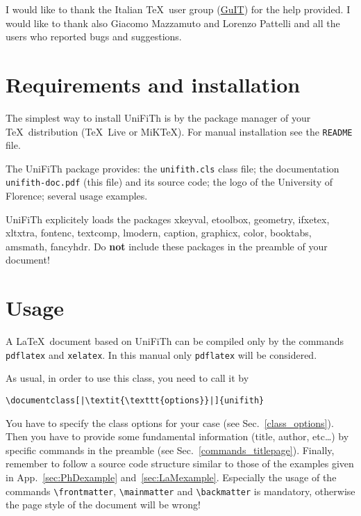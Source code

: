 \documentclass[a5paper,11pt]{article}
\newcommand{\bs}{\textbackslash}
\begin{document}
I would like to thank the Italian \TeX\ user group (\href{http://www.guitex.org/}{GuIT}) for the help provided. I would like to thank also Giacomo Mazzamuto and Lorenzo Pattelli and all the users who reported bugs and suggestions.

\section[Requirements\\ and installation]{Requirements and installation}
\label{requirements_installation}

The simplest way to install \textsf{UniFiTh} is by the package manager of 
your \TeX\ distribution (\TeX\ Live or MiK\TeX). For manual installation see 
the \texttt{README} file. 

The \textsf{UniFiTh} package provides: the 
\texttt{unifith.cls} class file; the documentation 
\texttt{unifith-doc.pdf} (this file) and its source code; the logo of the 
University of Florence; several usage examples.


\textsf{UniFiTh} explicitely loads the packages \textsf{xkeyval}, \textsf{etoolbox}, \textsf{geometry}, \textsf{ifxetex}, \textsf{xltxtra}, \textsf{fontenc}, \textsf{textcomp}, \textsf{lmodern}, \textsf{caption}, \textsf{graphicx}, \textsf{color}, \textsf{booktabs}, \textsf{amsmath}, \textsf{fancyhdr}.
Do \textbf{not} include these packages in the preamble of your document!





\section{Usage}

A \LaTeX\ document based on \textsf{UniFiTh} can be compiled only by the commands
\texttt{pdflatex} and \texttt{xelatex}. In this manual only \texttt{pdflatex} will be considered.


As usual, in order to use this class, you need to call it by
\begin{lstlisting}
\documentclass[|\textit{\texttt{options}}|]{unifith}
\end{lstlisting}
You have to specify the class options for your case (see Sec.~\ref{class_options}). Then you have to provide some fundamental information (title, author, etc\ldots) by specific commands in the preamble (see Sec.~\ref{commands_titlepage}). Finally, remember to follow a source code structure similar to those of the examples given in App.~\ref{sec:PhDexample} and~\ref{sec:LaMexample}.
Especially the usage of the commands \texttt{\bs frontmatter}, \texttt{\bs mainmatter} and \texttt{\bs backmatter} is mandatory, otherwise the page style of the document will be wrong!
\end{document}

